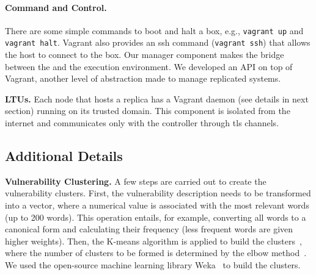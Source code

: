 \paragraph{Command and Control.}
There are some simple commands to boot and halt a box, e.g., \texttt{vagrant up} and \texttt{vagrant halt}. 
Vagrant also provides an ssh command (\texttt{vagrant ssh}) that allows the host to connect to the box. 
Our manager component makes the bridge between the \risk and the execution environment.
We developed an API on top of Vagrant, another level of abstraction made to manage replicated systems.


 \textbf{LTUs.} Each node that hosts a replica has a Vagrant daemon (see details in next section) running on its trusted domain.
This component is isolated from the internet and communicates only with the \system controller through \gls{tls} channels.

\subsection*{Additional Details}
\label{sec:details}

\textbf{Vulnerability Clustering.}
A few steps are carried out to create the vulnerability clusters. 
First, the vulnerability description needs to be transformed into a vector, where a numerical value is associated with the most relevant words (up to 200 words). 
This operation entails, for example, converting all words to a canonical form and calculating their frequency (less frequent words are given higher weights).
Then, the K-means algorithm is applied to build the clusters~\cite{Jain:2010}, where the number of clusters to be formed is determined by the elbow method~\cite{Thorndike:1953}. 
We used the open-source machine learning library Weka~\cite{weka} to build the clusters. 


